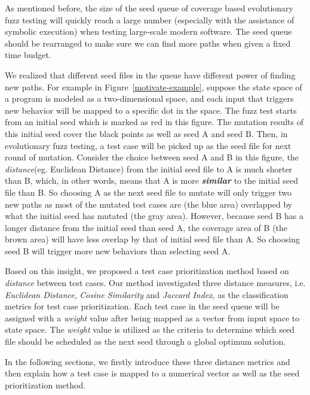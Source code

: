 As mentioned before, the size of the seed queue of coverage based evolutionary fuzz testing will quickly reach a large number (especially with the assistance of symbolic execution) when testing large-scale modern software. The seed queue should be rearranged to make sure we can find more paths when given a fixed time budget.


We realized that different seed files in the queue have different power of finding new paths. For example in Figure~\ref{motivate-example}, suppose the state space of a program is modeled as a two-dimensional space, and each input that triggers new behavior will be mapped to a specific dot in the space. The fuzz test starts from an initial seed which is marked as red in this figure. The mutation results of this initial seed cover the black points as well as seed A and seed B. Then, in evolutionary fuzz testing, a test case will be picked up as the seed file for next round of mutation. 
Consider the choice between seed A and B in this figure, the \emph{distance}(eg. Euclidean Distance) from the initial seed file to A is much shorter than B, which, in other words, means that A is more \textbf{\textit{similar}} to the initial seed file than B. So choosing A as the next seed file to mutate will only trigger two new paths as most of the mutated test cases are (the blue area) overlapped by what the initial seed has mutated (the gray area). However, because seed B has a longer distance from the initial seed than seed A, the coverage area of B (the brown area) will have less overlap by that of initial seed file than A. So choosing seed B will trigger more new behaviors than selecting seed A.


Based on this insight, we proposed a test case prioritization method based on \emph{distance} between test cases. Our method investigated three distance measures, i.e. \textit{Euclidean Distance}, \textit{Cosine Similarity} and \textit{Jaccard Index}, as the classification metrics for test case prioritization. Each test case in the seed queue will be assigned with a \emph{weight} value after being mapped as a vector from input space to state space. The \emph{weight} value is utilized as the criteria to determine which seed file should be scheduled as the next seed through a global optimum solution.

In the following sections, we firstly introduce these three distance metrics and then explain how a test case is mapped to a numerical vector as well as the seed prioritization method.

